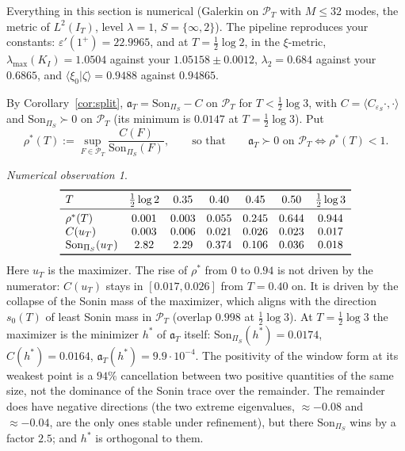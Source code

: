 \documentclass[11pt]{amsart}
\theoremstyle{definition}
\theoremstyle{remark}
\newtheorem{observation}[theorem]{Numerical observation}
\newcommand{\IT}{I_T}
\newcommand{\PT}{\mathcal P_T}
\newcommand{\Son}{\mathrm{Son}}
\begin{document}
Everything in this section is numerical (Galerkin on $\PT$ with $M\le32$ modes, the metric of $L^2(\IT)$, level $\lambda=1$,
$S=\{\infty,2\}$). The pipeline reproduces your constants: $\varepsilon'(1^+)=22.9965$, and at $T=\frac12\log2$, in the
$\xi$-metric, $\lambda_{\max}(K_I)=1.0504$ against your $1.05158\pm0.0012$, $\lambda_2=0.684$ against your $0.6865$, and
$\langle\xi_0|\zeta\rangle=0.9488$ against $0.94865$.

By Corollary~\ref{cor:split}, $\mathfrak a_T=\Son_{\Pi_S}-C$ on $\PT$ for $T<\frac12\log3$, with $C=\langle C_{\varepsilon_S}\cdot,\cdot\rangle$
and $\Son_{\Pi_S}\succ0$ on $\PT$ (its minimum is $0.0147$ at $T=\frac12\log3$). Put
\[
\rho^*(T):=\sup_{F\in\PT}\frac{C(F)}{\Son_{\Pi_S}(F)},\qquad\text{so that}\qquad \mathfrak a_T\succ0\text{ on }\PT\iff\rho^*(T)<1 .
\]

\begin{observation}\label{obs:rho}
\[
\begin{array}{lcccccc}\toprule
T & \tfrac12\log2 & 0.35 & 0.40 & 0.45 & 0.50 & \tfrac12\log3\\ \midrule
\rho^*(T) & 0.001 & 0.003 & 0.055 & 0.245 & 0.644 & 0.944\\
C(u_T) & 0.003 & 0.006 & 0.021 & 0.026 & 0.023 & 0.017\\
\Son_{\Pi_S}(u_T) & 2.82 & 2.29 & 0.374 & 0.106 & 0.036 & 0.018\\ \bottomrule
\end{array}
\]
Here $u_T$ is the maximizer. The rise of $\rho^*$ from $0$ to $0.94$ is not driven by the numerator: $C(u_T)$ stays in
$[0.017,0.026]$ from $T=0.40$ on. It is driven by the collapse of the Sonin mass of the maximizer, which aligns with the
direction $s_0(T)$ of least Sonin mass in $\PT$ (overlap $0.998$ at $\frac12\log3$). At $T=\frac12\log3$ the maximizer is the
minimizer $h^*$ of $\mathfrak a_T$ itself: $\Son_{\Pi_S}(h^*)=0.0174$, $C(h^*)=0.0164$, $\mathfrak a_T(h^*)=9.9\cdot10^{-4}$. The
positivity of the window form at its weakest point is a $94\%$ cancellation between two positive quantities of the same size,
not the dominance of the Sonin trace over the remainder. The remainder does have negative directions (the two extreme eigenvalues, $\approx-0.08$ and $\approx-0.04$, are the only
ones stable under refinement), but there $\Son_{\Pi_S}$ wins by a factor $2.5$; and $h^*$ is orthogonal to them.
\end{observation}
\end{document}
